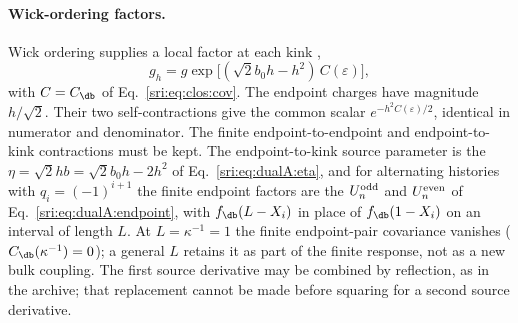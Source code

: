 \paragraph{Wick-ordering factors.} Wick ordering supplies a local factor at each kink
\cite[Eqs.~(3.20)--(3.23)]{sri:Benedetti:2025nzp},
\begin{equation}
 g_h=g\exp\bigl[(\sqrt2b_0h-h^2)\,C(\varepsilon)\bigr],
 \label{sri:eq:clos:gh}
\end{equation}
with $C=C_{\db}$ of Eq.~\eqref{sri:eq:clos:cov}. The endpoint charges have magnitude $h/\sqrt2$. Their two self-contractions
give the common scalar $e^{-h^2C(\varepsilon)/2}$, identical in numerator and denominator. The finite endpoint-to-endpoint
and endpoint-to-kink contractions must be kept. The endpoint-to-kink source parameter is the $\eta=\sqrt2hb
=\sqrt2b_0h-2h^2$ of Eq.~\eqref{sri:eq:dualA:eta}, and for alternating histories with $q_i=(-1)^{i+1}$ the finite endpoint
factors are the $U_n^{\rm odd}$ and $U_n^{\rm even}$ of Eq.~\eqref{sri:eq:dualA:endpoint}, with $f_{\db}(L-X_i)$ in place of
$f_{\db}(1-X_i)$ on an interval of length $L$. At
$L=\kappa^{-1}=1$ the finite endpoint-pair covariance vanishes ($C_{\db}(\kappa^{-1})=0$); a general $L$ retains it as
part of the finite response, not as a new bulk coupling. The first source derivative may be combined by reflection, as
in the archive; that replacement cannot be made before squaring for a second source derivative.

